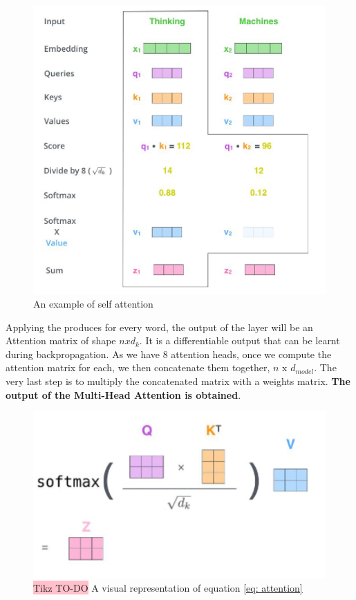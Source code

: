 \begin{figure}[H]
    \centering
    \includegraphics[width=0.75\linewidth]{tikz/Self Attention.png}
    \caption{An example of self attention}
    \label{fig:self-attention}
\end{figure}

Applying the produces for every word, the output of the layer will be an  Attention matrix  of  shape $n x d_k$. It is a differentiable output that can be learnt during backpropagation.
As we have 8  attention heads, once we compute the attention matrix for each,  we then concatenate them together, $n \text{ x } d_{model}$. The very last step is to  multiply the concatenated matrix with a weights matrix. \textbf{The output of the Multi-Head Attention is obtained}.

\begin{figure}[H]
    \centering
    \includegraphics[width=0.5\linewidth]{tikz/Attention formula.png}
    \caption{{\color{red}\colorbox{pink}{Tikz TO-DO}} A visual representation of equation \ref{eq: attention}}
    \label{fig:attention-formula}
\end{figure}

